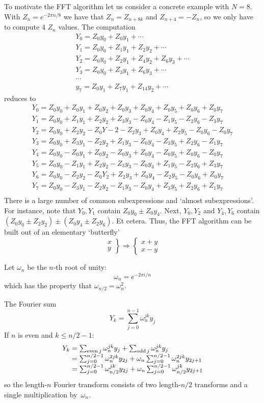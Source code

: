 To motivate the \acf{FFT} algorithm let us consider a concrete example
with $N=8$. With $Z_n=e^{-2\pi n/8}$ we have that $Z_n=Z_{n+8k}$ and
$Z_{n+4}=-Z_n$, so we only have to compute 4 $Z_n$ values. The
computation
\[ 
\begin{array}{l}
  Y_0 = Z_0y_0+Z_0y_1+\cdots\\
  Y_1 = Z_0y_0+Z_1y_1+Z_2y_2+\cdots\\
  Y_2 = Z_0y_0+Z_2y_1+Z_4y_2+Z_6y_3+\cdots\\
  Y_3 = Z_0y_0+Z_3y_1+Z_6y_3+\cdots\\
  \cdots\\
  y_7 = Z_0y_1+Z_7y_1+Z_{14}y_2+\cdots
\end{array}
\]
reduces to 
\[
\begin{array}{l}
  Y_0=Z_0y_0+Z_0y_1+Z_0y_2+Z_0y_3+Z_0y_4+Z_0y_5+Z_0y_6+Z_0y_7 \\
  Y_1=Z_0y_0+Z_1y_1+Z_2y_2+Z_3y_3-Z_0y_4-Z_1y_5-Z_2y_6-Z_3y_7 \\
  Y_2=Z_0y_0+Z_2y_2-Z_0Y-2-Z_2y_3+Z_0y_4+Z_2y_5-Z_0y_6-Z_0y_7 \\
  Y_3=Z_0y_0+Z_3y_1-Z_2y_2+Z_1y_3-Z_0y_4-Z_3y_5+Z_2y_6-Z_1y_7 \\
  Y_4=Z_0y_0-Z_0y_1+Z_0y_2-Z_0y_3+Z_0y_4-Z_0y_5+Z_0y_6-Z_0y_7 \\
  Y_5=Z_0y_0-Z_1y_1+Z_2y_2-Z_3y_3-Z_0y_4+Z_1y_5-Z_2y_6+Z_3y_7 \\
  Y_6=Z_0y_0-Z_2y_2-Z_0Y_2+Z_2y_3+Z_0y_4-Z_2y_5-Z_0y_6+Z_0y_7 \\
  Y_7=Z_0y_0-Z_3y_1-Z_2y_2-Z_1y_3-Z_0y_4+Z_3y_5+Z_2y_6+Z_1y_7 \\
\end{array}
\]
There is a large number of common subexpressions and `almost
subexpressions'. For instance, note that $Y_0,Y_1$ contain $Z_0y_0\pm
Z_0y_4$. Next, $Y_0,Y_2$ and $Y_4,Y_6$ contain $(Z_0y_0\pm Z_2y_2) \pm
(Z_0y_4\pm Z_2y_6)$. Et cetera. Thus, the \ac{FFT} algorithm can be
built out of an elementary `butterfly'
\[
  \left. \begin{array}{r}x\\y\end{array} \right\} 
    \Rightarrow
  \left\{ \begin{array}{r}x+y\\x-y\end{array} \right.
\]

Let $\omega_n$ be the $n$-th root of unity: \[ \omega_n=e^{-2\pi i/n} \]
which has the property that $\omega_{n/2}=\omega_n^2$.

The Fourier sum
\[ Y_k=\sum_{j=0}^{n-1} \omega_n^{jk} y_j \]
If $n$ is even and $k\leq n/2-1$:
\[
\begin{array}{r@{{}={}}l}
Y_k
&\sum_{\mathrm{even}\,j} \omega_n^{jk} y_j + \sum_{\mathrm{odd}\,j} \omega_n^{jk} y_j \\
&\sum_{j=0}^{n/2-1} \omega_n^{2jk} y_{2j} + \omega_n \sum_{j=0}^{n/2-1} \omega_n^{2jk} y_{2j+1} \\
&\sum_{j=0}^{n/2-1} \omega_{n/2}^{jk} y_{2j} + \omega_n \sum_{j=0}^{n/2-1} \omega_{n/2}^{jk} y_{2j+1}
\end{array}
\]
so the length-$n$ Fourier transform consists of two length-$n/2$ transforms and a single multiplication
by~$\omega_n$.

